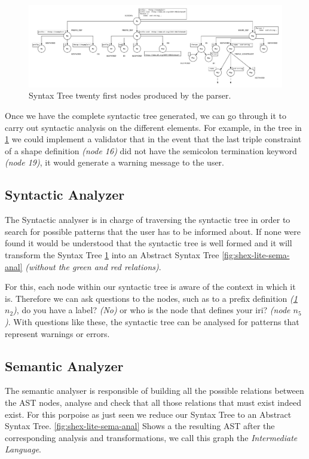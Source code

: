 \begin{figure}
    \includegraphics[width=\textwidth]{images/shex-lite-syntax-tree.pdf}
    \centering
    \caption[Syntax Tree twenty first nodes produced by the parser]{Syntax Tree twenty first nodes produced by the parser.}
    \label{fig:shex-lite-st}
\end{figure}

Once we have the complete syntactic tree generated, we can go through it to carry out syntactic analysis on the different elements.
For example, in the tree in \cref{fig:shex-lite-st} we could implement a validator that in the event that the last triple constraint
of a shape definition \textit{(node 16)} did not have the semicolon termination keyword \textit{(node 19)}, it would generate a
warning message to the user.

\subsection{Syntactic Analyzer}
The Syntactic analyser is in charge of traversing the syntactic tree in order to search for possible patterns that the user has to
be informed about. If none were found it would be understood that the syntactic tree is well formed and it will transform the Syntax Tree
\cref{fig:shex-lite-st} into an Abstract Syntax Tree \cref{fig:shex-lite-sema-anal} \textit{(without the green and red relations)}.

For this, each node within our syntactic tree is aware of the context in which it is. Therefore we can ask questions to the nodes,
such as to a prefix definition \textit{(\cref{fig:shex-lite-st} $n_2$)}, do you have a label? \textit{(No)} or who is the node
that defines your iri? \textit{(node $n_5$)}. With questions like these, the syntactic tree can be analysed for patterns that
represent warnings or errors.

\subsection{Semantic Analyzer}
The semantic analyser is responsible of building all the possible relations between the AST nodes, analyse and check that
all those relations that must exist indeed exist. For this porpoise as just seen we reduce our Syntax Tree to an
Abstract Syntax Tree. \cref{fig:shex-lite-sema-anal} Shows a the resulting AST after the corresponding analysis and
transformations, we call this graph the \textit{Intermediate Language}.


